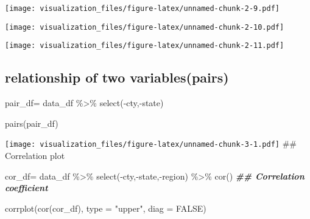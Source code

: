 \documentclass[
]{article}
\newenvironment{Shaded}{\begin{snugshade}}{\end{snugshade}}
\newcommand{\AttributeTok}[1]{\textcolor[rgb]{0.77,0.63,0.00}{#1}}
\newcommand{\ConstantTok}[1]{\textcolor[rgb]{0.00,0.00,0.00}{#1}}
\newcommand{\DocumentationTok}[1]{\textcolor[rgb]{0.56,0.35,0.01}{\textbf{\textit{#1}}}}
\newcommand{\FunctionTok}[1]{\textcolor[rgb]{0.00,0.00,0.00}{#1}}
\newcommand{\NormalTok}[1]{#1}
\newcommand{\OtherTok}[1]{\textcolor[rgb]{0.56,0.35,0.01}{#1}}
\newcommand{\SpecialCharTok}[1]{\textcolor[rgb]{0.00,0.00,0.00}{#1}}
\newcommand{\StringTok}[1]{\textcolor[rgb]{0.31,0.60,0.02}{#1}}
\begin{document}
\texttt{[image: visualization\_files/figure-latex/unnamed-chunk-2-9.pdf]}

\begin{Shaded}
\end{Shaded}

\texttt{[image: visualization\_files/figure-latex/unnamed-chunk-2-10.pdf]}

\begin{Shaded}
\end{Shaded}

\texttt{[image: visualization\_files/figure-latex/unnamed-chunk-2-11.pdf]}

\hypertarget{relationship-of-two-variablespairs}{%
\subsection{relationship of two
variables(pairs)}\label{relationship-of-two-variablespairs}}

\begin{Shaded}
\begin{Highlighting}[]
\NormalTok{pair\_df}\OtherTok{=}
\NormalTok{  data\_df }\SpecialCharTok{\%\textgreater{}\%} 
    \FunctionTok{select}\NormalTok{(}\SpecialCharTok{{-}}\NormalTok{cty,}\SpecialCharTok{{-}}\NormalTok{state) }
    
\FunctionTok{pairs}\NormalTok{(pair\_df)}
\end{Highlighting}
\end{Shaded}

\texttt{[image: visualization\_files/figure-latex/unnamed-chunk-3-1.pdf]}
\#\# Correlation plot

\begin{Shaded}
\begin{Highlighting}[]
\NormalTok{cor\_df}\OtherTok{=}
\NormalTok{  data\_df }\SpecialCharTok{\%\textgreater{}\%} 
    \FunctionTok{select}\NormalTok{(}\SpecialCharTok{{-}}\NormalTok{cty,}\SpecialCharTok{{-}}\NormalTok{state,}\SpecialCharTok{{-}}\NormalTok{region) }\SpecialCharTok{\%\textgreater{}\%} 
    \FunctionTok{cor}\NormalTok{() }\DocumentationTok{\#\# Correlation coefficient}


\FunctionTok{corrplot}\NormalTok{(}\FunctionTok{cor}\NormalTok{(cor\_df), }\AttributeTok{type =} \StringTok{"upper"}\NormalTok{, }\AttributeTok{diag =} \ConstantTok{FALSE}\NormalTok{)}
\end{Highlighting}
\end{Shaded}
\end{document}
